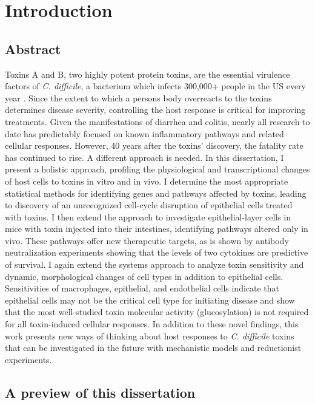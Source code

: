 
\chapter{Introduction}\label{chapter:intro1}

\section{Abstract}
Toxins A and B, two highly potent protein toxins, are the essential
virulence factors of \textit{C. difficile}, a bacterium which infects 300,000+
people in the US every year \cite{Lucado:2012wl}. 
Since the extent to which a persons body overreacts to the toxins
determines disease severity, controlling the host response is critical for improving treatments.
Given the manifestations of
diarrhea and colitis, nearly all research to date has predictably
focused on known inflammatory pathways and related cellular responses.
However, 40 years after the toxins' discovery, the fatality rate has continued to rise.
A different approach is needed. In this dissertation, I present a holistic approach,
profiling the physiological and transcriptional changes of host cells
to toxins in vitro and in vivo. I determine the most
appropriate statistical methods for identifying genes and pathways
affected by toxins, leading to discovery of an unrecognized cell-cycle
disruption of epithelial cells treated with toxins.
I then extend the approach to investigate epithelial-layer cells
in mice with toxin injected into their intestines, identifying
pathways altered only in vivo. These pathways offer new therapeutic targets,
as is shown by antibody neutralization experiments showing that the levels
of two cytokines are predictive of survival.
I again extend the systems approach to analyze toxin sensitivity
and dynamic, morphological changes of cell types in addition to epithelial cells.
Sensitivities of macrophages, epithelial, and endothelial cells
indicate that epithelial cells may not be the critical cell type
for initiating disease and show that the most well-studied toxin molecular
activity (glucosylation) is not required for all toxin-induced cellular responses.
In addition to these novel findings, this work presents new ways of thinking
about host responses to \textit{C. difficile} toxins that can be investigated
in the future with mechanistic models and reductionist experiments.


\section{A preview of this dissertation}

